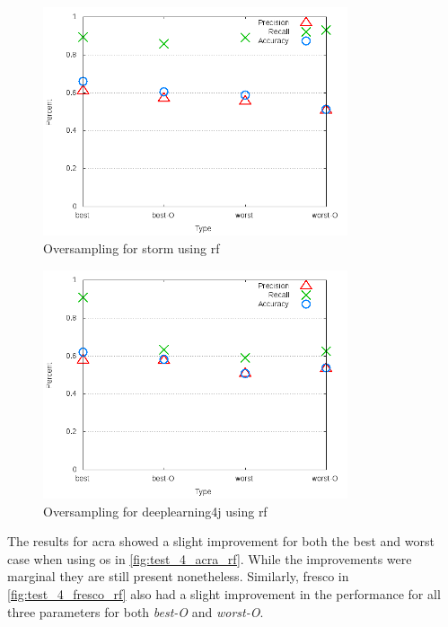 \begin{figure}[!ht]
    \centering
        \includegraphics[width=0.8\textwidth]{images/rf/test_4/storm_sample_range}
        \caption{Oversampling for storm using \gls{rf}}
        \label{fig:test_4_storm_rf}
\end{figure}

\begin{figure}[!ht]
    \centering
        \includegraphics[width=0.8\textwidth]{images/rf/test_4/deeplearning4j_sample_range}
    \caption{Oversampling for deeplearning4j using \gls{rf}}
    \label{fig:test_4_deeplearning4j_rf}
\end{figure}

The results for acra showed a slight improvement for both the best and worst case when using \gls{os} in \autoref{fig:test_4_acra_rf}. While the improvements were marginal they are still present nonetheless. Similarly, fresco in \autoref{fig:test_4_fresco_rf} also had a slight improvement in the performance for all three parameters for both \textit{best-O} and \textit{worst-O}.

